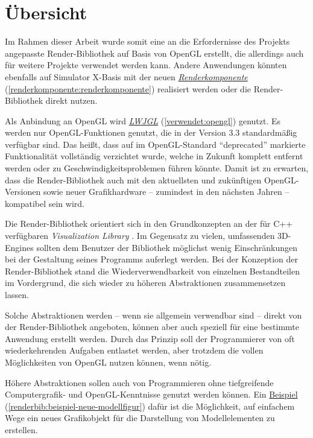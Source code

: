 \documentclass[a4paper,10pt]{sphinxmanual}
\begin{document}
\section{Übersicht}
\label{renderbib:ubersicht}
Im Rahmen dieser Arbeit wurde somit eine an die Erfordernisse des Projekts angepasste Render-Bibliothek auf Basis von OpenGL erstellt, die allerdings auch für weitere Projekte verwendet werden kann.
Andere Anwendungen könnten ebenfalls auf Simulator X-Basis mit der neuen {\hyperref[renderkomponente:renderkomponente]{\emph{Renderkomponente}}} (\autoref*{renderkomponente:renderkomponente}) realisiert werden oder die Render-Bibliothek direkt nutzen.

Als Anbindung an OpenGL wird {\hyperref[verwendet:opengl]{\emph{LWJGL}}} (\autoref*{verwendet:opengl}) genutzt.
Es werden nur OpenGL-Funktionen genutzt, die in der Version 3.3 standardmäßig verfügbar sind.
Das heißt, dass auf im OpenGL-Standard "`deprecated"' markierte Funktionalität vollständig verzichtet wurde, welche in Zukunft komplett entfernt werden oder zu Geschwindigkeitsproblemen führen könnte.
Damit ist zu erwarten, dass die Render-Bibliothek auch mit den aktuellsten und zukünftigen OpenGL-Versionen sowie neuer Grafikhardware – zumindest in den nächsten Jahren – kompatibel sein wird.

Die Render-Bibliothek orientiert sich in den Grundkonzepten an der für C++ verfügbaren \emph{Visualization Library} \cite{www:vislib}.
Im Gegensatz zu vielen, umfassenden 3D-Engines sollten dem Benutzer der Bibliothek möglichst wenig Einschränkungen bei der Gestaltung seines Programms auferlegt werden.
Bei der Konzeption der Render-Bibliothek stand die Wiederverwendbarkeit von einzelnen Bestandteilen im Vordergrund, die sich wieder zu höheren Abstraktionen zusammensetzen lassen.

Solche Abstraktionen werden – wenn sie allgemein verwendbar sind – direkt von der Render-Bibliothek angeboten, können aber auch speziell für eine bestimmte Anwendung erstellt werden.
Durch das Prinzip soll der Programmierer von oft wiederkehrenden Aufgaben entlastet werden, aber trotzdem die vollen Möglichkeiten von OpenGL nutzen können, wenn nötig.

Höhere Abstraktionen sollen auch von Programmieren ohne tiefgreifende Computergrafik- und OpenGL-Kenntnisse genutzt werden können.
Ein {\hyperref[renderbib:beispiel-neue-modellfigur]{Beispiel}} (\autoref*{renderbib:beispiel-neue-modellfigur}) dafür ist die Möglichkeit, auf einfachem Wege ein neues Grafikobjekt für die Darstellung von Modellelementen zu erstellen.
\end{document}
